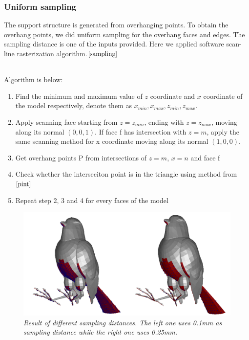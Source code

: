 \documentclass[11pt, a4paper]{article}
\begin{document}
	\subsubsection{Uniform sampling}
	The support structure is generated from overhanging points. To obtain the overhang points, we did uniform sampling for the overhang faces and edges. The sampling distance is one of the inputs provided. Here we applied software scan-line rasterization algorithm.$\cite{sampling}$
	
	~\\Algorithm is below:
	\begin{enumerate}
	\item Find the minimum and maximum value of $z$ coordinate and $x$ coordinate of the model respectively, denote them as $x_{min}, x_{max}, z_{min}, z_{max}$.
	\item Apply scanning face starting from $z=z_{min}$, ending with $z=z_{max}$, moving along its normal $(0,0,1)$. If face f has intersection with $z=m$, apply the same scanning method for x coordinate moving along its normal $(1,0,0)$. 
	\item Get overhang points P from intersections of $z=m$, $x=n$ and face f
	\item Check whether the interseciton point is in the triangle using method from $\cite{pint}$
	\item Repeat step 2, 3 and 4 for every faces of the model
	\end{enumerate}
	\begin{figure}[!ht]
  		\centering
      	\includegraphics[width=1.0\textwidth]{Figure_3.png}
  	\caption{\textit{Result of different sampling distances. The left one uses 0.1mm as sampling distance while the right one uses 0.25mm.}}
	\end{figure}
\end{document}
